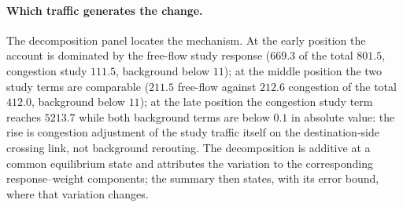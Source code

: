 \paragraph{Which traffic generates the change.}
The decomposition panel locates the mechanism. At the early position
the account is dominated by the free-flow study response ($669.3$ of
the total $801.5$, congestion study $111.5$, background below $11$); at
the middle position the two study terms are comparable ($211.5$
free-flow against $212.6$ congestion of the total $412.0$, background
below $11$); at the late position the congestion study term reaches
$5213.7$ while both background terms are below $0.1$ in absolute value:
the rise is congestion adjustment of the study traffic itself on the
destination-side crossing link, not background rerouting. The
decomposition is additive at a common equilibrium state and attributes
the variation to the corresponding response--weight components; the
summary then states, with its error bound, where that variation
changes.

